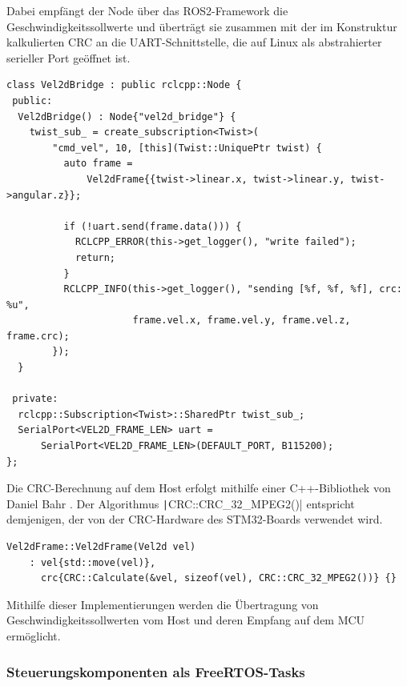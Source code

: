 Dabei empfängt der Node über das ROS2-Framework die Geschwindigkeitssollwerte
und überträgt sie zusammen mit der im Konstruktur kalkulierten CRC an die
UART-Schnittstelle, die auf Linux als abstrahierter serieller Port geöffnet ist.

\begin{code}
\begin{verbatim}
class Vel2dBridge : public rclcpp::Node {
 public:
  Vel2dBridge() : Node{"vel2d_bridge"} {
    twist_sub_ = create_subscription<Twist>(
        "cmd_vel", 10, [this](Twist::UniquePtr twist) {
          auto frame =
              Vel2dFrame{{twist->linear.x, twist->linear.y, twist->angular.z}};

          if (!uart.send(frame.data())) {
            RCLCPP_ERROR(this->get_logger(), "write failed");
            return;
          }
          RCLCPP_INFO(this->get_logger(), "sending [%f, %f, %f], crc: %u",
                      frame.vel.x, frame.vel.y, frame.vel.z, frame.crc);
        });
  }

 private:
  rclcpp::Subscription<Twist>::SharedPtr twist_sub_;
  SerialPort<VEL2D_FRAME_LEN> uart =
      SerialPort<VEL2D_FRAME_LEN>(DEFAULT_PORT, B115200);
};
\end{verbatim}
\end{code}

Die CRC-Berechnung auf dem Host erfolgt mithilfe einer C++-Bibliothek von Daniel
Bahr \cite{CRCpp}. Der Algorithmus \texttt|CRC::CRC_32_MPEG2()|
entspricht demjenigen, der von der CRC-Hardware des STM32-Boards verwendet wird.

\begin{code}
\begin{verbatim}
Vel2dFrame::Vel2dFrame(Vel2d vel)
    : vel{std::move(vel)},
      crc{CRC::Calculate(&vel, sizeof(vel), CRC::CRC_32_MPEG2())} {}
\end{verbatim}
\end{code}

Mithilfe dieser Implementierungen werden die Übertragung von
Geschwindigkeitssollwerten vom Host und deren Empfang auf dem MCU ermöglicht.

\subsubsection{Steuerungskomponenten als FreeRTOS-Tasks}
\label{sec:freertos_tasks}

